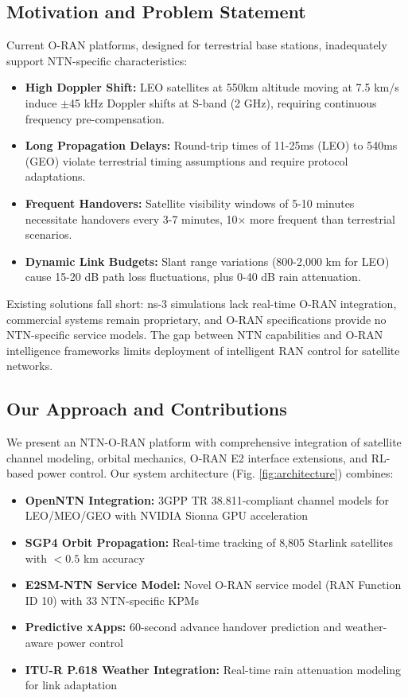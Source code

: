 \documentclass[conference]{IEEEtran}
\begin{document}
\subsection{Motivation and Problem Statement}

Current O-RAN platforms, designed for terrestrial base stations, inadequately support NTN-specific characteristics:

\begin{itemize}
    \item \textbf{High Doppler Shift:} LEO satellites at 550km altitude moving at 7.5 km/s induce $\pm$45 kHz Doppler shifts at S-band (2 GHz), requiring continuous frequency pre-compensation.
    \item \textbf{Long Propagation Delays:} Round-trip times of 11-25ms (LEO) to 540ms (GEO) violate terrestrial timing assumptions and require protocol adaptations.
    \item \textbf{Frequent Handovers:} Satellite visibility windows of 5-10 minutes necessitate handovers every 3-7 minutes, 10$\times$ more frequent than terrestrial scenarios.
    \item \textbf{Dynamic Link Budgets:} Slant range variations (800-2,000 km for LEO) cause 15-20 dB path loss fluctuations, plus 0-40 dB rain attenuation.
\end{itemize}

Existing solutions fall short: ns-3 simulations \cite{ns3_ntn} lack real-time O-RAN integration, commercial systems remain proprietary, and O-RAN specifications \cite{oran_e2ap, oran_e2sm} provide no NTN-specific service models. The gap between NTN capabilities and O-RAN intelligence frameworks limits deployment of intelligent RAN control for satellite networks.

\subsection{Our Approach and Contributions}

We present an NTN-O-RAN platform with comprehensive integration of satellite channel modeling, orbital mechanics, O-RAN E2 interface extensions, and RL-based power control. Our system architecture (Fig. \ref{fig:architecture}) combines:

\begin{itemize}
    \item \textbf{OpenNTN Integration:} 3GPP TR 38.811-compliant channel models for LEO/MEO/GEO with NVIDIA Sionna GPU acceleration
    \item \textbf{SGP4 Orbit Propagation:} Real-time tracking of 8,805 Starlink satellites with $<0.5$ km accuracy
    \item \textbf{E2SM-NTN Service Model:} Novel O-RAN service model (RAN Function ID 10) with 33 NTN-specific KPMs
    \item \textbf{Predictive xApps:} 60-second advance handover prediction and weather-aware power control
    \item \textbf{ITU-R P.618 Weather Integration:} Real-time rain attenuation modeling for link adaptation
\end{itemize}
\end{document}
